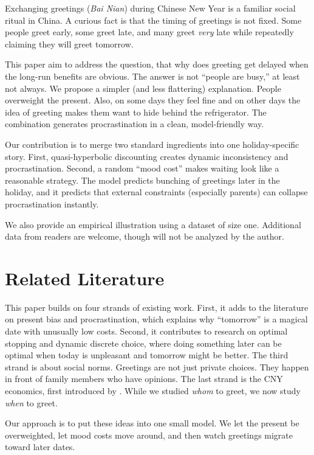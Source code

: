 \documentclass[AER]{AEA}
\begin{document}
Exchanging greetings (\textit{Bai Nian}) during Chinese New Year is a familiar social ritual in China. A curious fact is that the timing of greetings is not fixed. Some people greet early, some greet late, and many greet \emph{very} late while repeatedly claiming they will greet tomorrow.

This paper aim to address the question, that why does greeting get delayed when the long-run benefits are obvious. The answer is not ``people are busy,'' at least not always. We propose a simpler (and less flattering) explanation. People overweight the present. Also, on some days they feel fine and on other days the idea of greeting makes them want to hide behind the refrigerator. The combination generates procrastination in a clean, model-friendly way.

Our contribution is to merge two standard ingredients into one holiday-specific story. First, quasi-hyperbolic discounting creates dynamic inconsistency and procrastination. Second, a random ``mood cost'' makes waiting look like a reasonable strategy. The model predicts bunching of greetings later in the holiday, and it predicts that external constraints (especially parents) can collapse procrastination instantly.

We also provide an empirical illustration using a dataset of size one. Additional data from readers are welcome, though will not be analyzed by the author.

\section{Related Literature}
This paper builds on four strands of existing work. First, it adds to the literature on present bias and procrastination, which explains why ``tomorrow'' is a magical date with unusually low costs. Second, it contributes to research on optimal stopping and dynamic discrete choice, where doing something later can be optimal when today is unpleasant and tomorrow might be better. The third strand is about social norms. Greetings are not just private choices. They happen in front of family members who have opinions. The last strand is the CNY economics, first introduced by \citet{chatgpt2026}. While we studied \textit{whom} to greet, we now study \textit{when} to greet.

Our approach is to put these ideas into one small model. We let the present be overweighted, let mood costs move around, and then watch greetings migrate toward later dates.
\end{document}
